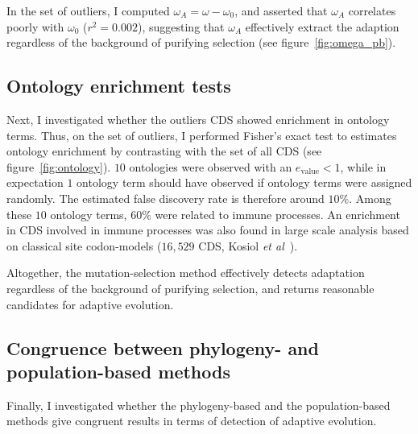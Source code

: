 \documentclass{article}
\begin{document}
In the set of outliers, I computed  $\omega_A = \omega - \omega_0$, and asserted that $\omega_A$ correlates poorly with $ \omega_0$ ($r^2=0.002$), suggesting that $\omega_A$ effectively extract the adaption regardless of the background of purifying selection (see figure~\ref{fig:omega_pb}).

\subsection*{Ontology enrichment tests}
Next, I investigated whether the outliers CDS showed enrichment in ontology terms.
Thus, on the set of outliers, I performed Fisher's exact test to estimates ontology enrichment by contrasting with the set of all CDS (see figure~\ref{fig:ontology}).
$10$ ontologies were observed with an $e_{\mathrm{value}} <1$, while in expectation $1$ ontology term should have observed if ontology terms were assigned randomly.
The estimated false discovery rate is therefore around $10 \%$.
Among these $10$ ontology terms, $60 \%$ were related to immune processes.
An enrichment in CDS involved in immune processes was also found in large scale analysis based on classical site codon-models ($16,529$ CDS, Kosiol \textit{et al}~\citep{Kosiol2008}).


Altogether, the mutation-selection method effectively detects adaptation regardless of the background of purifying selection, and returns reasonable candidates for adaptive evolution.


\subsection*{Congruence between phylogeny- and population-based methods}
Finally, I investigated whether the phylogeny-based and the population-based methods give congruent results in terms of detection of adaptive evolution.
\end{document}

